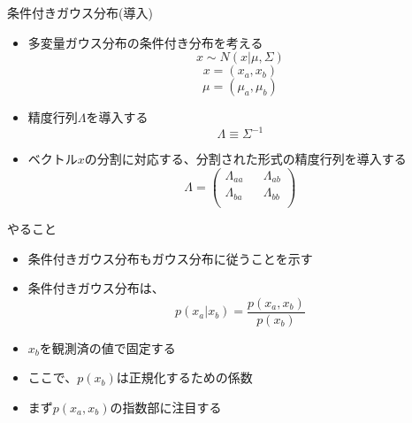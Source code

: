 \begin{frame}{条件付きガウス分布(導入)}
\begin{itemize}
 \item 多変量ガウス分布の条件付き分布を考える
       \begin{equation}
				x\sim N(x|\mu, \Sigma)
       \end{equation}
       \begin{equation}
	x = (x_a, x_b)
       \end{equation}
       \begin{equation}
	\mu = (\mu_a, \mu_b)
       \end{equation}

 \item 精度行列$\Lambda$を導入する
 \begin{equation}
	\Lambda \equiv \Sigma^{-1}
 \end{equation}

 \item ベクトル$x$の分割に対応する、分割された形式の精度行列を導入する
       \begin{equation}
				\Lambda=
				 \begin{pmatrix}
					\Lambda_{aa} && \Lambda_{ab}\\
					\Lambda_{ba} && \Lambda_{bb}\\
				 \end{pmatrix}
       \end{equation}
\end{itemize}
\end{frame}

\begin{frame}{やること}
\begin{itemize}
 \item 条件付きガウス分布もガウス分布に従うことを示す
 \item 条件付きガウス分布は、
			 \begin{equation}
 p(x_a | x_b) = \frac{p(x_a, x_b)}{p(x_b)}
			 \end{equation}
 \item $x_b$を観測済の値で固定する
 \item ここで、$p(x_b)$は正規化するための係数
 \item まず$p(x_a,x_b)$の指数部に注目する

\end{itemize}

\end{frame}


